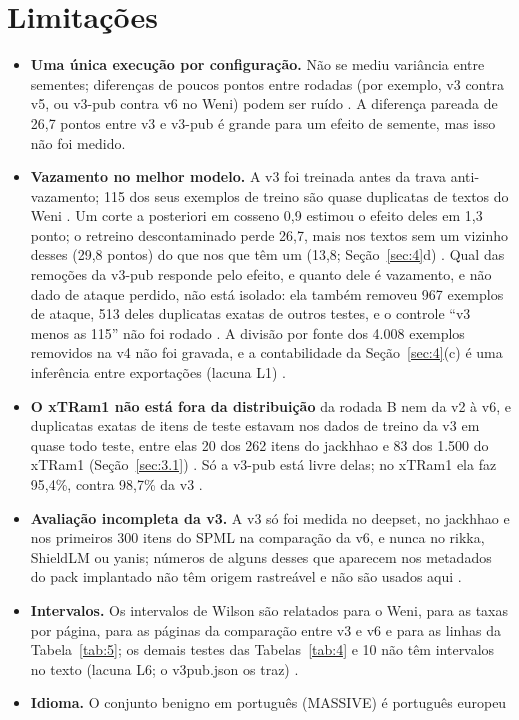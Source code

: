 \documentclass[11pt]{article}
\begin{document}
\section{Limitações}\label{sec:10}

\begin{itemize}
\item \textbf{Uma única execução por configuração.} Não se mediu variância entre sementes; diferenças de poucos pontos entre rodadas (por exemplo, v3 contra v5, ou v3-pub contra v6 no Weni) podem ser ruído%
. A diferença pareada de 26,7 pontos entre v3 e v3-pub é grande para um efeito de semente, mas isso não foi medido.
\item \textbf{Vazamento no melhor modelo.} A v3 foi treinada antes da trava anti-vazamento; 115 dos seus exemplos de treino são quase duplicatas de textos do Weni%
. Um corte a posteriori em cosseno 0,9 estimou o efeito deles em 1,3 ponto; o retreino descontaminado perde 26,7, mais nos textos sem um vizinho desses (29,8 pontos) do que nos que têm um (13,8; Seção~\ref{sec:4}d)%
. Qual das remoções da v3-pub responde pelo efeito, e quanto dele é vazamento, e não dado de ataque perdido, não está isolado: ela também removeu 967 exemplos de ataque, 513 deles duplicatas exatas de outros testes, e o controle ``v3 menos as 115'' não foi rodado%
. A divisão por fonte dos 4.008 exemplos removidos na v4 não foi gravada, e a contabilidade da Seção~\ref{sec:4}(c) é uma inferência entre exportações (lacuna L1)%
.
\item \textbf{O xTRam1 não está fora da distribuição} da rodada B nem da v2 à v6, e duplicatas exatas de itens de teste estavam nos dados de treino da v3 em quase todo teste, entre elas 20 dos 262 itens do jackhhao e 83 dos 1.500 do xTRam1 (Seção~\ref{sec:3.1})%
. Só a v3-pub está livre delas; no xTRam1 ela faz 95,4\%, contra 98,7\% da v3%
.
\item \textbf{Avaliação incompleta da v3.} A v3 só foi medida no deepset, no jackhhao e nos primeiros 300 itens do SPML na comparação da v6, e nunca no rikka, ShieldLM ou yanis; números de alguns desses que aparecem nos metadados do pack implantado não têm origem rastreável e não são usados aqui%
.
\item \textbf{Intervalos.} Os intervalos de Wilson são relatados para o Weni, para as taxas por página, para as páginas da comparação entre v3 e v6 e para as linhas da Tabela~\ref{tab:5}; os demais testes das Tabelas~\ref{tab:4} e 10 não têm intervalos no texto (lacuna L6; o v3pub.json os traz)%
.
\item \textbf{Idioma.} O conjunto benigno em português (MASSIVE) é português europeu%

\end{itemize}
\end{document}
